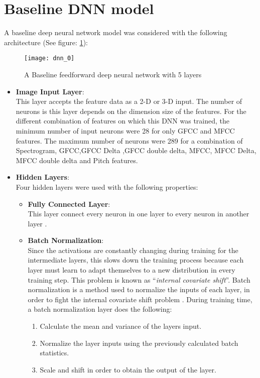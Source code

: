 \section{Baseline DNN model}
A baseline deep neural network model was considered with the following architecture (See figure: \ref{fig:dnn_0}):
\begin{figure}[!htbp]
\centering
\texttt{[image: dnn\_0]}
\caption{A Baseline feedforward deep neural network with 5 layers}
\label{fig:dnn_0}
\end{figure}
\begin{itemize}
\item \textbf{Image Input Layer}:\\
This layer accepts the feature data as a 2-D or 3-D input. The number of neurons is this layer depends on the dimension size of the features. For the different combination of features on which this DNN was trained, the minimum number of input neurons were 28 for only GFCC and MFCC features. The maximum number of neurons were 289 for a combination of Spectrogram, GFCC,GFCC Delta ,GFCC double delta, MFCC, MFCC Delta, MFCC double delta and Pitch features.
\item \textbf{Hidden Layers}:\\
Four hidden layers were used with the following properties:
\begin{itemize}
\item \textbf{Fully Connected Layer}:\\
This layer connect every neuron in one layer to every neuron in another layer \cite{wiki:cnn}.
\item \textbf{Batch Normalization}:\\
Since the activations are constantly changing during training for the intermediate layers, this slows down the training process because each layer must learn to adapt themselves to a new distribution in every training step. This problem is known as \enquote{\textit{internal covariate shift}}. Batch normalization is a method used to normalize the inputs of each layer, in order to fight the internal covariate shift problem \cite{wiki:batch}. During training time, a batch normalization layer does the following:
\begin{enumerate}
\item Calculate the mean and variance of the layers input.
\item Normalize the layer inputs using the previously calculated batch statistics.
\item Scale and shift in order to obtain the output of the layer.

\end{enumerate}
\end{itemize}
\end{itemize}
